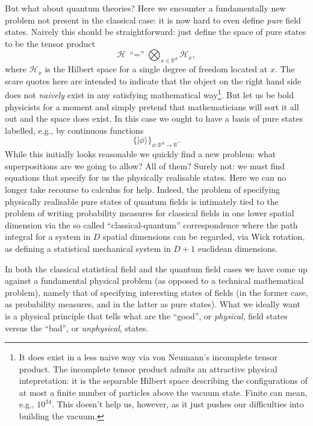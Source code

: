 \documentclass[11pt]{amsart}
\theoremstyle{plain}%
\theoremstyle{definition}
\theoremstyle{remark}
\begin{document}
But what about quantum theories? Here we encounter a fundamentally new problem not present in the classical case: it is now hard to even define \emph{pure} field states. Naively this should be straightforward: just define the space of pure states to be the tensor product
\begin{equation}
	\mathcal{H}\, \text{``$=$''} \bigotimes_{x\in \mathbb{R}^d} \mathcal{H}_x,
\end{equation}
where $\mathcal{H}_x$ is the Hilbert space for a single degree of freedom located at $x$. The scare quotes here are intended to indicate that the object on the right hand side does not \emph{naively} exist in any satisfying mathematical way\footnote{It does exist in a less naive way via von Neumann's incomplete tensor product. The incomplete tensor product admits an attractive physical intepretation: it is the separable Hilbert space describing the configurations of at most a finite number of particles above the vacuum state. Finite can mean, e.g., $10^{34}$. This doesn't help us, however, as it just pushes our difficulties into building the vacuum.}. But let us be bold physicists for a moment and simply pretend that mathematicians will sort it all out and the space does exist. In this case we ought to have a basis of pure states labelled, e.g., by continuous functions
\begin{equation}
	\{|\phi\rangle \}_{\phi:\mathbb{R}^d\rightarrow \mathbb{R}}.
\end{equation}
While this initially looks reasonable we quickly find a new problem: what superpositions are we going to allow? All of them? Surely not: we must find equations that specify for us the physically realisable states. Here we can no longer take recourse to calculus for help. Indeed, the problem of specifying physically realisable pure states of quantum fields is intimately tied to the problem of writing probability measures for classical fields in one lower spatial dimension via the so called ``classical-quantum'' correspondence where the path integral for a system in $D$ spatial dimensions can be regarded, via Wick rotation, as defining a statistical mechanical system in $D+1$ euclidean dimensions.

In both the classical statistical field and the quantum field cases we have come up against a fundamental physical problem (as opposed to a technical mathematical problem), namely that of specifying interesting states of fields (in the former case, as probability measures, and in the latter as pure states). What we ideally want is a physical principle that tells what are the ``good'', or \emph{physical}, field states versus the ``bad'', or \emph{unphysical}, states.  
\end{document}
